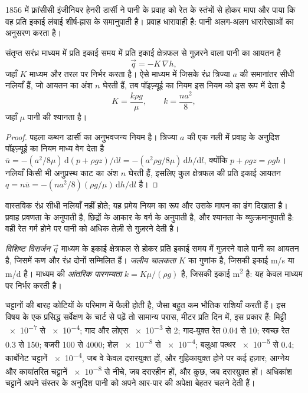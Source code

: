 1856 में फ़्रांसीसी इंजीनियर हेनरी डार्सी ने पानी के प्रवाह को
रेत के स्तंभों से होकर मापा और पाया कि वह प्रति इकाई लंबाई
शीर्ष-ह्रास के समानुपाती है। प्रवाह धारावाही है: पानी अलग-अलग धारारेखाओं का अनुसरण करता है।

\begin{theorem}[डार्सी का नियम]\label{thm:b3:hydrogeology:darcy}
संतृप्त सरंध्र माध्यम में प्रति इकाई समय में प्रति इकाई क्षेत्रफल से गुज़रने वाला
पानी का आयतन है
\[
\vec q = -K\,\nabla h ,
\]
जहाँ $K$ माध्यम और तरल पर निर्भर करता है। ऐसे माध्यम में जिसके रंध्र
त्रिज्या $a$ की समानांतर सीधी नलियाँ हैं, जो आयतन का अंश $n$ घेरती हैं,
तब पॉइज़्यूई का नियम इस नियम को इस रूप में देता है
\[
K = \frac{k\rho g}{\mu}, \qquad k = \frac{na^2}{8} ,
\]
जहाँ $\mu$ पानी की श्यानता है।
\end{theorem}

\begin{proof}
पहला कथन डार्सी का अनुभवजन्य नियम है। त्रिज्या $a$ की एक नली में
प्रवाह के अनुदिश पॉइज़्यूई का नियम माध्य वेग देता है $\bar u =
-(a^2/8\mu)\,\mathrm d(p + \rho gz)/\mathrm dl = -(a^2\rho g/8\mu)\,\mathrm
dh/\mathrm dl$, क्योंकि $p + \rho gz = \rho g h$। नलियाँ किसी भी अनुप्रस्थ काट का
अंश $n$ घेरती हैं, इसलिए कुल क्षेत्रफल की प्रति इकाई आयतन
$q = n\bar u = -(na^2/8)(\rho g/\mu)\,\mathrm dh/\mathrm dl$ है।
\end{proof}

वास्तविक रंध्र सीधी नलियाँ नहीं होते; यह प्रमेय नियम का रूप और
उसके मापन का ढंग दिखाता है। प्रवाह प्रवणता के अनुपाती है, छिद्रों के आकार के वर्ग
के अनुपाती है, और श्यानता के व्युत्क्रमानुपाती है: वही रेत
गर्म होने पर पानी को अधिक तेज़ी से गुज़रने देती है।

\begin{definition}\label{def:b3:hydrogeology:darcy}
\emph{विशिष्ट विसर्जन} $\vec q$ माध्यम के इकाई क्षेत्रफल से होकर
प्रति इकाई समय में गुज़रने वाले पानी का आयतन है, जिसमें कण और रंध्र दोनों
सम्मिलित हैं। \emph{जलीय
चालकता} $K$  का गुणांक है,
जिसकी इकाई \unit{m/s} या \unit{m/d} है। माध्यम की \emph{आंतरिक
पारगम्यता} $k =
K\mu/(\rho g)$ है, जिसकी इकाई \unit{m^2} है: यह केवल माध्यम पर निर्भर करती है।
\end{definition}

चट्टानों की  बारह कोटियों के परिमाण में फैली होती है,
जैसा बहुत कम भौतिक राशियाँ करती हैं। इस विषय के एक प्रसिद्ध सर्वेक्षण के चार्ट से पढ़ें तो
सामान्य परास, मीटर प्रति दिन में, इस प्रकार हैं: मिट्टी
\num{e-7} से \num{e-4}; गाद और लोएस \num{e-3} से 2; गाद-युक्त रेत 0.04 से
10; स्वच्छ रेत 0.3 से 150; बजरी 100 से 4000; शेल \num{e-8} से
\num{e-4}; बलुआ पत्थर \num{e-5} से 0.4; कार्बोनेट चट्टानें \num{e-4}, जब वे केवल दरारयुक्त हों,
और गुहिकायुक्त होने पर कई हज़ार; आग्नेय और कायांतरित चट्टानें
\num{e-8} से नीचे, जब दरारहीन हों, और कुछ, जब दरारयुक्त हों।
अधिकांश चट्टानें अपने संस्तर के अनुदिश पानी को अपने आर-पार की अपेक्षा
बेहतर चलने देती हैं।

